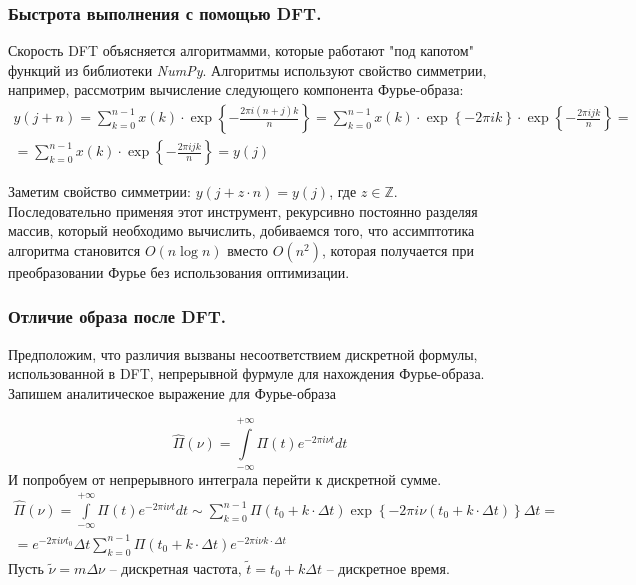 \documentclass[a5paper, 10pt]{article}
\theoremstyle{definition}
\theoremstyle{plain}
\theoremstyle{remark}
\begin{document}
\subsubsection{ Быстрота выполнения с помощью DFT.}
Скорость DFT объясняется алгоритмамми, которые работают "под капотом" функций из библиотеки \textit{NumPy}. Алгоритмы используют свойство симметрии, например, рассмотрим вычисление следующего компонента Фурье-образа:
\begin{multline}
y(j + n) = \sum \limits_{k=0}^{n-1} x(k) \cdot \exp \left\{ - \frac{2\pi  i (n + j) k}{n} \right\} =  \sum \limits_{k=0}^{n-1} x(k) \cdot \exp \left\{ - 2\pi  i  k \right\} \cdot \exp \left\{ - \frac{2\pi  i  j k}{n} \right\} =\\= \sum \limits_{k=0}^{n-1} x(k) \cdot \exp \left\{ - \frac{2\pi  i  j k}{n} \right\} = y(j)
\end{multline}

Заметим свойство симметрии: $y(j + z \cdot n) = y(j)$, где $z \in \mathbb{Z}$.\\

 Последовательно применяя этот инструмент, рекурсивно постоянно разделяя массив, который необходимо вычислить, добиваемся того, что ассимптотика алгоритма становится $O(n \log n)$ вместо $O(n^2)$, которая получается при преобразовании Фурье без использования оптимизации.


\newpage
\subsubsection{Отличие образа после DFT.}

Предположим, что различия вызваны несоответствием дискретной формулы, использованной в DFT, непрерывной фурмуле для нахождения Фурье-образа. Запишем аналитическое выражение для Фурье-образа

\begin{equation}
\hat{\Pi}(\nu) = \int \limits_{-\infty}^{+\infty} \Pi(t) e^{-2\pi i \nu t} dt
\end{equation}
И попробуем от непрерывного интеграла перейти к дискретной сумме. 
\begin{multline}
\hat{\Pi}(\nu) = \int \limits_{-\infty}^{+\infty} \Pi(t) e^{-2\pi i \nu t} dt \sim \sum \limits_{k=0}^{n-1} \Pi(t_0 + k \cdot \Delta t)  \exp \left\{ - 2\pi  i \nu (t_0 + k \cdot \Delta t) \right\} \Delta t = \\ = e^{ - 2\pi  i \nu t_0 } \Delta t  \sum \limits_{k=0}^{n-1} \Pi(t_0 + k \cdot \Delta t)  e^{ - 2\pi  i \nu  k \cdot \Delta t}
\end{multline}
Пусть $\widetilde{\nu} = m \Delta \nu $ -- дискретная частота, $\widetilde{t} = t_0 + k \Delta t$ -- дискретное время.
\end{document}
